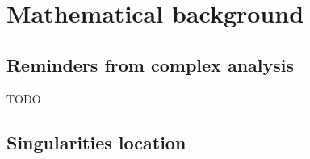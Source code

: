 \documentclass[../main.tex]{subfiles}
\begin{document}
\chapter{Mathematical background}

\section{Reminders from complex analysis}

TODO

%
%	
%
%	
%	
%

\section{Singularities location}

%
%
%
%
%
%
%
\end{document}

